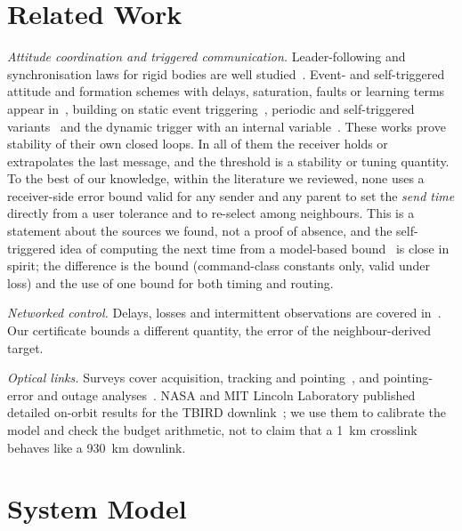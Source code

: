 \documentclass[journal]{IEEEtran}
\begin{document}
\section{Related Work}
\emph{Attitude coordination and triggered communication.} Leader-following and synchronisation laws for rigid bodies are well studied~\cite{ren2007,sarlette2009,abdessameud2009,mayhew2011,dimarogonas2009,cai2014}. Event- and self-triggered attitude and formation schemes with delays, saturation, faults or learning terms appear in~\cite{wang2021,xie2023,xie2024asr,jia2023,xie2024taes}, building on static event triggering~\cite{tabuada2007}, periodic and self-triggered variants~\cite{heemels2013,mazo2010,heemels2012,donkers2012} and the dynamic trigger with an internal variable~\cite{girard2015}. These works prove stability of their own closed loops. In all of them the receiver holds or extrapolates the last message, and the threshold is a stability or tuning quantity. To the best of our knowledge, within the literature we reviewed, none uses a receiver-side error bound valid for any sender and any parent to set the \emph{send time} directly from a user tolerance and to re-select among neighbours. This is a statement about the sources we found, not a proof of absence, and the self-triggered idea of computing the next time from a model-based bound~\cite{mazo2010,heemels2012} is close in spirit; the difference is the bound (command-class constants only, valid under loss) and the use of one bound for both timing and routing.

\emph{Networked control.} Delays, losses and intermittent observations are covered in~\cite{hespanha2007,zhang2001,sinopoli2004,olfati2007,nowzari2019}. Our certificate bounds a different quantity, the error of the neighbour-derived target.

\emph{Optical links.} Surveys cover acquisition, tracking and pointing~\cite{kaymak2018,kaushal2017,toyoshima2005}, and pointing-error and outage analyses~\cite{farid2007,khalighi2014}. NASA and MIT Lincoln Laboratory published detailed on-orbit results for the TBIRD downlink~\cite{schieler2023,schieler2023icsos}; we use them to calibrate the model and check the budget arithmetic, not to claim that a 1~km crosslink behaves like a 930~km downlink.

\section{System Model}
\end{document}
